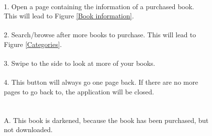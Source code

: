 \documentclass[12pt]{article}
\begin{document}
\begin{figure}
\caption{
\\
1. Open a page containing the information of a purchased book. This will lead to Figure \ref{Book information}.\\\\
2. Search/browse after more books to purchase. This will lead to Figure \ref{Categories}.\\\\
3. Swipe to the side to look at more of your books.\\\\
4. This button will always go one page back. If there are no more pages to go back to, the application will be closed.\\\\\\
A. This book is darkened, because the book has been purchased, but not downloaded.
}
\label{Front page}
\end{figure}
\end{document}
